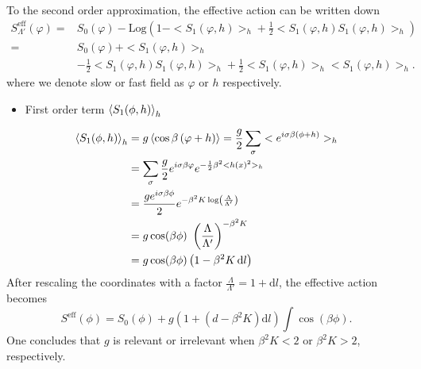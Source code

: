 \documentclass[submission, PhysLectNotes]{SciPost}
\begin{document}
To the second order approximation, the effective action can be written down 
\begin{equation}
	\begin{aligned}
		S_{\Lambda '}^{\text{eff}} ( \varphi  ) =& S_0(\varphi ) -\text{Log} \left( 1 - <S_1(\varphi ,h)>_h + \frac{1 }{2}<S_1(\varphi ,h)S_1(\varphi ,h)>_h \right) \\
		= &S_0(\varphi) + <S_1(\varphi ,h)>_h \\
		&- \frac{1}{2}<S_1(\varphi ,h)S_1(\varphi ,h)>_h + \frac{1}{2}<S_1(\varphi ,h)>_h<S_1(\varphi ,h)>_h.
	\end{aligned}
\end{equation}
where we denote slow or fast field as $\varphi$ or $h$ respectively. 

\begin{itemize}
	\item First order term $\expval{S_1(\phi ,h)}_h$
\end{itemize}
\begin{equation}
	\begin{aligned}
		\expval{S_1(\phi ,h)}_h &= g \expval{\cos \beta \left(\varphi+h\right)} = \frac{g}{2}\sum _{\sigma }< e^{i \sigma  \beta  ( \phi  +h)}>_{h }\\
		& = \sum_\sigma \frac{g}{2}e^{i \sigma
		\beta  \varphi }e^{-\frac{1}{2}\beta ^2 <h(x)^2>_h } \\
 		&= \frac{g e^{i \sigma  \beta  \phi }}{2}e^{-\beta ^2 K\log 
			\left(\frac{\Lambda }{\Lambda '}\right) } \\
		&=g \cos  (\beta  \phi )\text{  }\left(\frac{\Lambda }{\Lambda '}\right)^{-\beta ^2K} \\
		&= g \cos(\beta  \phi )\left( 1 - \beta ^2K\,\mathrm{d}l \right)
	\end{aligned}
\end{equation}
After rescaling the coordinates with a factor $\frac{\Lambda}{\Lambda'}=1+\mathrm{d}l$, the effective action becomes
\begin{equation}
S^{\text{eff}}( \phi  ) = S_0(\phi ) +g \left(1 + \left(d-\beta^2K \right)\mathrm{d}l\right) \int \cos  (\beta  \phi ) .
\end{equation}
One concludes that \(g\) is relevant or irrelevant when \(\beta^2K<2\) or \(\beta ^2K>2\), respectively.
\end{document}

